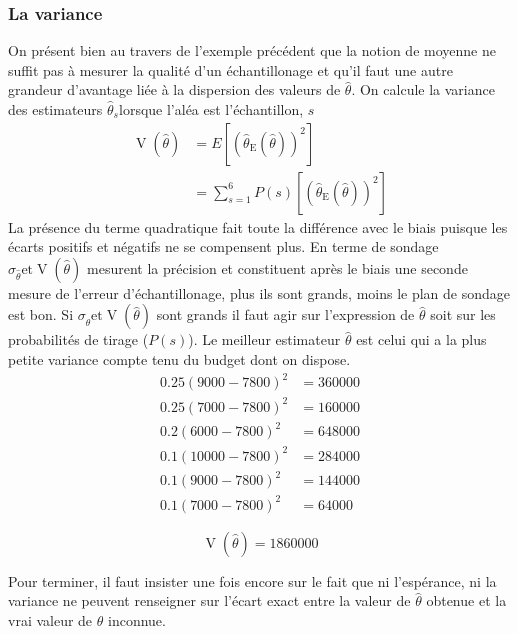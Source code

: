 \documentclass[a4paper]{article}
\DeclareMathOperator{\E}{E}
\DeclareMathOperator{\V}{V}
\begin{document}
\subsubsection{La variance}
On présent bien au travers de l'exemple précédent que la notion de moyenne ne suffit pas à mesurer la qualité d'un échantillonage et qu'il faut une
autre grandeur d'avantage liée à la dispersion des valeurs de $\hat{\theta}$. On calcule la variance des estimateurs $\hat{\theta}_s$lorsque l'aléa est
l'échantillon, $s$
\begin{equation*}
\begin{split}
\V(\hat{\theta}) &= E \left[ \left( \hat{\theta} _ \E\left( \hat{\theta} \right)  \right)^2  \right] \\
    &= \sum_{s = 1}^6 P(s) \left[ \left( \hat{\theta} _ \E \left( \hat{\theta} \right)  \right)^2 \right]  
\end{split}
\end{equation*}
La présence du terme quadratique fait toute la différence avec le biais puisque les écarts positifs et négatifs ne se compensent plus. En terme de
sondage $\sigma_{\hat{\theta}} \text{et} \V(\hat{\theta})$ mesurent la précision et constituent après le biais une seconde mesure de l'erreur 
d'échantillonage, plus ils sont grands, moins le plan de sondage est bon. Si $\sigma_{\hat{\theta}} \text{et} \V(\hat{\theta})$ sont grands il faut 
agir sur l'expression de $\hat{\theta}$ soit sur les probabilités de tirage ($P(s)$). Le meilleur estimateur $\hat{\theta}$ est celui qui a la plus
petite variance compte tenu du budget dont on dispose.
\begin{equation*}
\begin{split}
    0.25 (9000 - 7800)^2 &= 360000 \\
    0.25 (7000 - 7800)^2 &= 160000 \\
    0.2 (6000 - 7800)^2 &= 648000 \\
    0.1 (10000 - 7800)^2 &= 284000 \\
    0.1 (9000 - 7800)^2 &= 144000\\
    0.1 (7000 - 7800)^2 &= 64000
\end{split}
\end{equation*}

\begin{equation*}
    \V\left( \hat{\theta} \right) = 1860000 
\end{equation*}

Pour terminer, il faut insister une fois encore sur le fait que ni l'espérance, ni la variance ne peuvent renseigner sur l'écart exact entre la valeur
de $\hat{\theta}$ obtenue et la vrai valeur de $\theta$ inconnue.
\end{document}
